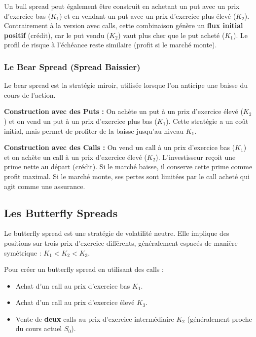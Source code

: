 \begin{remarquebox}
Un bull spread peut également être construit en achetant un put avec un prix d'exercice bas ($K_1$) et en vendant un put avec un prix d'exercice plus élevé ($K_2$). Contrairement à la version avec calls, cette combinaison génère un \textbf{flux initial positif} (crédit), car le put vendu ($K_2$) vaut plus cher que le put acheté ($K_1$). Le profil de risque à l'échéance reste similaire (profit si le marché monte).
\end{remarquebox}

\subsubsection{Le Bear Spread (Spread Baissier)}

Le bear spread est la stratégie miroir, utilisée lorsque l'on anticipe une baisse du cours de l'action.

\textbf{Construction avec des Puts :}
On achète un put à un prix d'exercice élevé ($K_2$) et on vend un put à un prix d'exercice plus bas ($K_1$).
Cette stratégie a un coût initial, mais permet de profiter de la baisse jusqu'au niveau $K_1$.

\textbf{Construction avec des Calls :}
On vend un call à un prix d'exercice bas ($K_1$) et on achète un call à un prix d'exercice élevé ($K_2$).
L'investisseur reçoit une prime nette au départ (crédit). Si le marché baisse, il conserve cette prime comme profit maximal. Si le marché monte, ses pertes sont limitées par le call acheté qui agit comme une assurance.

\subsection{Les Butterfly Spreads}

Le butterfly spread est une stratégie de volatilité neutre. Elle implique des positions sur trois prix d'exercice différents, généralement espacés de manière symétrique : $K_1 < K_2 < K_3$.

\begin{definitionbox}
Pour créer un butterfly spread en utilisant des calls :
\begin{itemize}
    \item Achat d'un call au prix d'exercice bas $K_1$.
    \item Achat d'un call au prix d'exercice élevé $K_3$.
    \item Vente de \textbf{deux} calls au prix d'exercice intermédiaire $K_2$ (généralement proche du cours actuel $S_0$).
\end{itemize}
\end{definitionbox}

